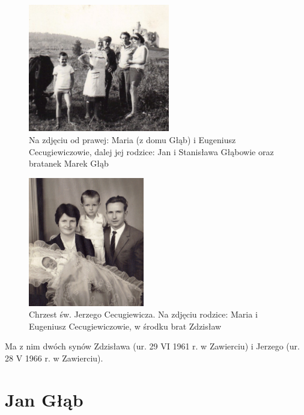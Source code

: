 \begin{figure}[!h]
\begin{center}
\includegraphics[width=0.55\textwidth]{zdjecia/maria_eugeniusz_cecugiewicz_z_rodzicami.jpg}
\caption[Maria i Eugeniusz Cecugiewicz z rodzicami]{Na zdjęciu od prawej: Maria (z domu Głąb) i Eugeniusz Cecugiewiczowie, dalej jej rodzice: Jan i Stanisława Głąbowie oraz bratanek Marek Głąb}
\label{rys:maria_eugeniusz_cecugiewicz_z_rodzicami}
\end{center}
\end{figure}

\begin{figure}[!h]
\begin{center}
\includegraphics[width=0.45\textwidth]{zdjecia/chrzest_jerzego_cecugiewicza.jpg}
\caption[Chrzest św. Jerzego Cecugiewicza]{Chrzest św. Jerzego Cecugiewicza. Na zdjęciu rodzice: Maria i Eugeniusz Cecugiewiczowie, w środku brat Zdzisław}
\label{rys:chrzest_jerzego_cecugiewicza}
\end{center}
\end{figure}

Ma z nim dwóch synów Zdzisława (ur. 29 VI 1961 r. w Zawierciu) i Jerzego (ur. 28 V 1966 r. w Zawierciu).


\section{Jan Głąb}

